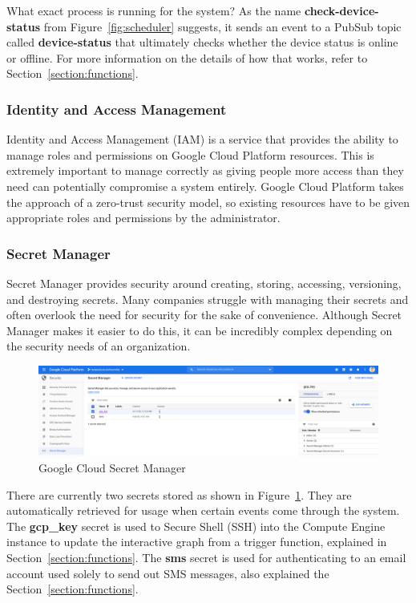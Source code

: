 \documentclass{article}
\begin{document}
What exact process is running for the system? As the name \textbf{check-device-status} from Figure~\ref{fig:scheduler} suggests, it sends an event to a PubSub topic called \textbf{device-status} that ultimately checks whether the device status is online or offline. For more information on the details of how that works, refer to Section~\ref{section:functions}.

\subsubsection{Identity and Access Management}
Identity and Access Management (IAM) is a service that provides the ability to manage roles and permissions on Google Cloud Platform resources. This is extremely important to manage correctly as giving people more access than they need can potentially compromise a system entirely. Google Cloud Platform takes the approach of a zero-trust security model, so existing resources have to be given appropriate roles and permissions by the administrator.

\subsubsection{Secret Manager}
Secret Manager provides security around creating, storing, accessing, versioning, and destroying secrets. Many companies struggle with managing their secrets and often overlook the need for security for the sake of convenience. Although Secret Manager makes it easier to do this, it can be incredibly complex depending on the security needs of an organization.

\begin{figure}[H]
	\center
	\includegraphics[width=\textwidth]{images/secret-manager.png}
	\caption{Google Cloud Secret Manager}
	\label{fig:secret-manager}
\end{figure}

There are currently two secrets stored as shown in Figure~\ref{fig:secret-manager}. They are automatically retrieved for usage when certain events come through the system. The \textbf{gcp\_key} secret is used to Secure Shell (SSH) into the Compute Engine instance to update the interactive graph from a trigger function, explained in Section~\ref{section:functions}. The \textbf{sms} secret is used for authenticating to an email account used solely to send out SMS messages, also explained the Section~\ref{section:functions}.
\end{document}
